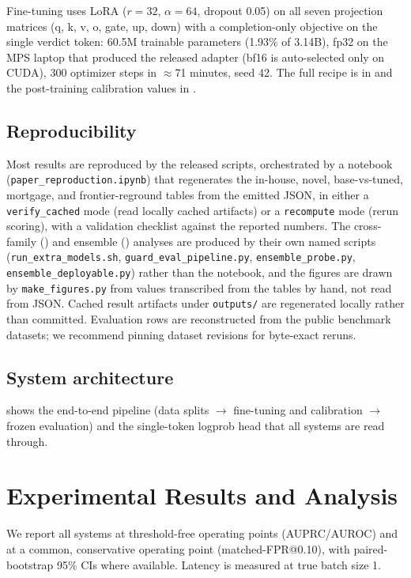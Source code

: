 \documentclass[sigconf,nonacm]{acmart}
\begin{document}
Fine-tuning uses LoRA ($r=32$, $\alpha=64$, dropout 0.05) on all seven projection matrices (q, k, v, o, gate, up, down) with a completion-only objective on the single verdict token: 60.5M trainable parameters (1.93\% of 3.14B), fp32 on the MPS laptop that produced the released adapter (bf16 is auto-selected only on CUDA), 300 optimizer steps in $\approx$71 minutes, seed 42. The full recipe is in  and the post-training calibration values in .

\subsection{Reproducibility}

Most results are reproduced by the released scripts, orchestrated by a notebook (\texttt{paper\_reproduction.ipynb}) that regenerates the in-house, novel, base-vs-tuned, mortgage, and frontier-reground tables from the emitted JSON, in either a \texttt{verify\_cached} mode (read locally cached artifacts) or a \texttt{recompute} mode (rerun scoring), with a validation checklist against the reported numbers. The cross-family () and ensemble () analyses are produced by their own named scripts (\texttt{run\_extra\_models.sh}, \texttt{guard\_eval\_pipeline.py}, \texttt{ensemble\_probe.py}, \texttt{ensemble\_deployable.py}) rather than the notebook, and the figures are drawn by \texttt{make\_figures.py} from values transcribed from the tables by hand, not read from JSON. Cached result artifacts under \texttt{outputs/} are regenerated locally rather than committed. Evaluation rows are reconstructed from the public benchmark datasets; we recommend pinning dataset revisions for byte-exact reruns.

\subsection{System architecture}

 shows the end-to-end pipeline (data splits $\to$ fine-tuning and calibration $\to$ frozen evaluation) and  the single-token logprob head that all systems are read through.

\section{Experimental Results and Analysis}
\label{sec:results}

We report all systems at threshold-free operating points (AUPRC/AUROC) and at a common, conservative operating point (matched-FPR@0.10), with paired-bootstrap 95\% CIs where available. Latency is measured at true batch size 1.
\end{document}
